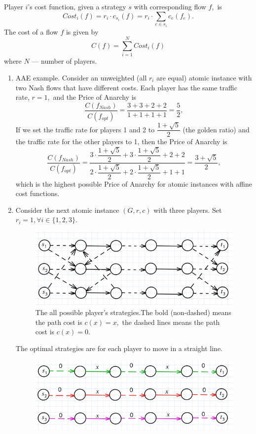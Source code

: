 \documentclass[a4paper, 12pt]{article}
\begin{document}
Player $i$’s cost function, given a strategy $s$ with corresponding flow $f,$ is
$$
	Cost_i(f) = r_i \cdot c_{s_i}(f) = r_i \cdot \sum \limits_{e \in s_i} c_e(f_e).
$$
The cost of a flow $f$ is given by
$$
C(f) = \sum \limits_{i=1}^N Cost_i(f)
$$
where $N$ --- number of players.
\begin{enumerate}
	\item AAE example. Consider an unweighted (all $r_i$ are equal) atomic instance with two Nash flows that have different costs. Each player
has the same traffic rate, $r = 1,$ and the Price of Anarchy is 
$$
\dfrac{C(f_{Nash})}{C(f_{opt})} = \dfrac{3 + 3 + 2 + 2}{1 + 1 + 1 + 1} = \dfrac{5}{2},
$$
 If we set the
traffic rate for players 1 and 2 to $\dfrac{1 + \sqrt{5}}{2}$ (the golden ratio) and the traffic
rate for the other players to 1, then the Price of Anarchy is 
$$
\dfrac{C(f_{Nash})}{C(f_{opt})} = \dfrac{3 \cdot \dfrac{1 + \sqrt{5}}{2} + 3 \cdot \dfrac{1 + \sqrt{5}}{2} + 2 + 2}{2 \cdot \dfrac{1 + \sqrt{5}}{2} + 2 \cdot \dfrac{1 + \sqrt{5}}{2} + 1 + 1} = \dfrac{3 + \sqrt{5}}{2},
$$ which
is the highest possible Price of Anarchy for atomic instances with affine cost functions. 
	\item Consider the next atomic instance $(G, r, c)$ with three players. Set $r_i = 1, \forall i \in \{1, 2, 3\}.$ 
	\begin{figure}[H]
\centering
\includegraphics[width=\textwidth]{Images/Task4_2_2.png}
\caption{The all possible player's strategies.The bold (non-dashed) means the path cost is $c(x) = x,$ the dashed lines means the path cost is $c(x) = 0.$}
\end{figure}
The optimal strategies are for each player to move in a straight line. 
\begin{figure}[H]
\centering
\includegraphics[width=\textwidth]{Images/Task4_2.png}

\end{figure}
\end{enumerate}
\end{document}
